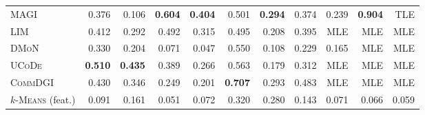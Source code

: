 \documentclass[11pt,a4paper]{article}
\begin{document}
\begin{table}[H]
\begin{tabular*}{\textwidth}{@{\extracolsep{\fill}}l rrrrrrrrrr@{}}
        \textsc{MAGI} & 0.376 & 0.106 & \textbf{0.604} & \textbf{0.404} & 0.501 & \textbf{0.294} & 0.374 & 0.239 & \textbf{0.904} & TLE \\
        \textsc{LIM} & 0.412 & 0.292 & 0.492 & 0.315 & 0.495 & 0.208 & 0.395 & MLE & MLE & MLE \\
        \textsc{DMoN} & 0.330 & 0.204 & 0.071 & 0.047 & 0.550 & 0.108 & 0.229 & 0.165 & MLE & MLE \\
        \textsc{UCoDe} & \textbf{0.510} & \textbf{0.435} & 0.389 & 0.266 & 0.563 & 0.179 & 0.312 & MLE & MLE & MLE \\
        \textsc{CommDGI} & 0.430 & 0.346 & 0.249 & 0.201 & \textbf{0.707} & 0.293 & 0.483 & MLE & MLE & MLE \\
        \midrule
        \textsc{$k$-Means} (feat.) & 0.091 & 0.161 & 0.051 & 0.072 & 0.320 & 0.280 & 0.143 & 0.071 & 0.066 & 0.059 \\
        \bottomrule
    \end{tabular*}
\end{table}
\end{document}
